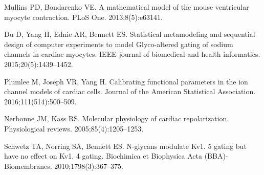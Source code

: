 \documentclass[10pt,letterpaper]{article}
\begin{document}
\begin{thebibliography}{10}
Mullins PD, Bondarenko VE.
\newblock A mathematical model of the mouse ventricular myocyte contraction.
\newblock PLoS One. 2013;8(5):e63141.

Du D, Yang H, Ednie AR, Bennett ES.
\newblock Statistical metamodeling and sequential design of computer
  experiments to model Glyco-altered gating of sodium channels in cardiac
  myocytes.
\newblock IEEE journal of biomedical and health informatics.
  2015;20(5):1439--1452.

Plumlee M, Joseph VR, Yang H.
\newblock Calibrating functional parameters in the ion channel models of
  cardiac cells.
\newblock Journal of the American Statistical Association.
  2016;111(514):500--509.

Nerbonne JM, Kass RS.
\newblock Molecular physiology of cardiac repolarization.
\newblock Physiological reviews. 2005;85(4):1205--1253.

Schwetz TA, Norring SA, Bennett ES.
\newblock N-glycans modulate Kv1. 5 gating but have no effect on Kv1. 4 gating.
\newblock Biochimica et Biophysica Acta (BBA)-Biomembranes.
  2010;1798(3):367--375.

\end{thebibliography}
\end{document}
